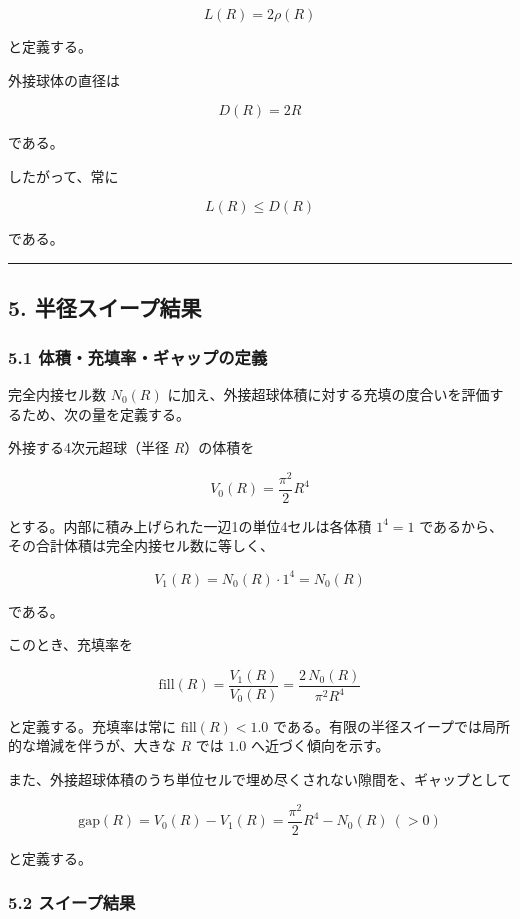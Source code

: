 \documentclass[
]{ltjsarticle}
\begin{document}
\[
L(R)=2\rho(R)
\]

と定義する。

外接球体の直径は

\[
D(R)=2R
\]

である。

したがって、常に

\[
L(R)\le D(R)
\]

である。

\begin{center}\rule{0.5\linewidth}{0.5pt}\end{center}

\subsection{5.
半径スイープ結果}\label{ux534aux5f84ux30b9ux30a4ux30fcux30d7ux7d50ux679c}

\subsubsection{5.1
体積・充填率・ギャップの定義}\label{ux4f53ux7a4dux5145ux586bux7387ux30aeux30e3ux30c3ux30d7ux306eux5b9aux7fa9}

完全内接セル数 \(N_0(R)\)
に加え、外接超球体積に対する充填の度合いを評価するため、次の量を定義する。

外接する4次元超球（半径 \(R\)）の体積を

\[
V_0(R)=\frac{\pi^2}{2}R^4
\]

とする。内部に積み上げられた一辺1の単位4セルは各体積 \(1^4=1\)
であるから、その合計体積は完全内接セル数に等しく、

\[
V_1(R)=N_0(R)\cdot 1^4=N_0(R)
\]

である。

このとき、充填率を

\[
\mathrm{fill}(R)=\frac{V_1(R)}{V_0(R)}=\frac{2\,N_0(R)}{\pi^2 R^4}
\]

と定義する。充填率は常に \(\mathrm{fill}(R)<1.0\)
である。有限の半径スイープでは局所的な増減を伴うが、大きな \(R\) では
\(1.0\) へ近づく傾向を示す。

また、外接超球体積のうち単位セルで埋め尽くされない隙間を、ギャップとして

\[
\mathrm{gap}(R)=V_0(R)-V_1(R)=\frac{\pi^2}{2}R^4-N_0(R)\ (>0)
\]

と定義する。

\subsubsection{5.2
スイープ結果}\label{ux30b9ux30a4ux30fcux30d7ux7d50ux679c}
\end{document}
